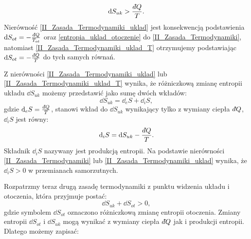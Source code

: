 \documentclass[10pt, a4paper, twoside, onecolumn]{article}
\numberwithin{equation}{section}
\newcommand{\dbar}{d\hspace*{-0.08em}\bar{}\hspace*{0.1em}}
\begin{document}
	\begin{equation}\label{II_Zasada_Termodynamiki_uklad_T}
		\dd{S_{uk}}>\frac{\dbar Q}{T}.
	\end{equation}
	Nierówność \eqref{II_Zasada_Termodynamiki_uklad} jest konsekwencją podstawienia \(\dd{S_{ot}}=-\frac{\dbar Q}{T_{ot}}\) oraz \eqref{entropia_uklad_otoczenie} do \eqref{II_Zasada_Termodynamiki}, natomiast \eqref{II_Zasada_Termodynamiki_uklad_T} otrzymujemy podstawiając \(\dd{S_{ot}}=-\frac{\dbar Q}{T}\) do tych samych równań. \par
	Z nierówności \eqref{II_Zasada_Termodynamiki_uklad} lub \eqref{II_Zasada_Termodynamiki_uklad_T} wynika, że różniczkową zmianę entropii układu \(\dd{S_{uk}}\) możemy przedstawić jako sumę dwóch wkładów:
	\begin{equation}
		\dd{S_{uk}}=\dd_{e}S+\dd_{i}S,
	\end{equation}
	gdzie \(\dd_{e}S=\frac{\dbar Q}{T}\), stanowi wkład do \(\dd{S_{uk}}\) wynikający tylko z wymiany ciepła \(\dbar Q\), \(\dd_{i}S\) jest równy:
	\begin{equation}
		\dd_{i}S=\dd{S_{uk}}-\frac{\dbar Q}{T}.
	\end{equation}
	Składnik \(\dd_{i}S\) nazywany jest produkcją entropii. Na podstawie nierówności \eqref{II_Zasada_Termodynamiki} lub \eqref{II_Zasada_Termodynamiki_uklad} wynika, że \(\dd_{i}S>0\) w przemianach samorzutnych. \par
	Rozpatrzmy teraz drugą zasadę termodynamiki z punktu widzenia układu i otoczenia, która przyjmuje postać:
	\begin{equation}\label{II_Zasada_Termodynamiki_uklad_i_otoczenie}
		\dd{S_{uk}}+\dd{S_{ot}}>0,
	\end{equation}
	gdzie symbolem \(\dd{S_{ot}}\) oznaczono różniczkową zmianę entropii otoczenia. Zmiany entropii \(\dd{S_{ot}}\) i \(\dd{S_{uk}}\) mogą wynikać z wymiany ciepła \(\dbar Q\) jak i produkcji entropii. Dlatego możemy zapisać:
\end{document}
